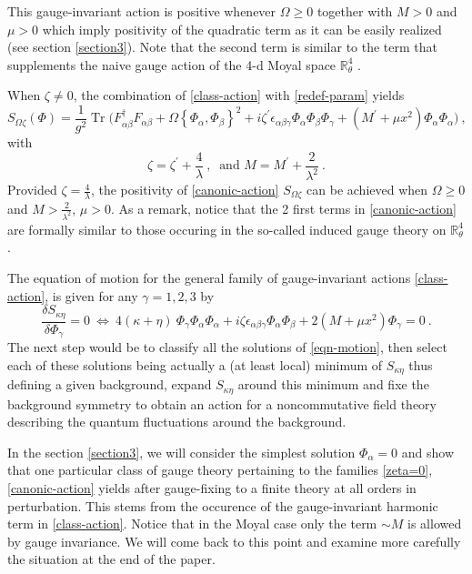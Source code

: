 \documentclass[a4paper,11pt,twoside]{article}
\numberwithin{equation}{section}
\DeclareMathOperator{\tr}{Tr}
\theoremstyle{nonumberplain}
\newcounter{and}
\begin{document}
%
This gauge-invariant action is positive whenever $\Omega\ge0$ together with $M>0$ and $\mu>0$ which imply positivity of the quadratic term as it can be easily realized (see section \ref{section3}). Note that the second term is similar to the term that supplements the naive gauge action of the 4-d Moyal space $\mathbb{R}^4_\theta$ \cite{GWW, GW07}.\par%
%
When $\zeta\ne0$, the combination of \eqref{class-action} with \eqref{redef-param} yields%
%
\begin{equation}
S_{\Omega\zeta}(\Phi) = \frac{1}{g^2} \tr\bigg(F^\dag_{\alpha\beta}F_{\alpha\beta} + \Omega\left\{\Phi_\alpha,\Phi_\beta\right\}^2 + i \zeta^\prime\epsilon_{\alpha\beta\gamma} \Phi_\alpha \Phi_\beta \Phi_\gamma + \left(M^\prime+\mu x^2\right) \Phi_\alpha \Phi_\alpha \bigg) \ , \label{canonic-action}
\end{equation}
%
with%
%
\begin{equation}
\zeta = \zeta^\prime+\frac{4}{\lambda} \ , \ \mbox{ and }  M=M^\prime+\frac{2}{\lambda^2} \ . \label{new-param}
\end{equation}
%
Provided $\zeta=\frac{4}{\lambda}$, the positivity of \eqref{canonic-action} $S_{\Omega\zeta}$ can be achieved when $\Omega\ge0$ and $M>\frac{2}{\lambda^2}$, $\mu>0$. As a remark, notice that the 2 first terms in \eqref{canonic-action} are formally similar to those occuring in the so-called induced gauge theory on $\mathbb{R}^4_\theta$ \cite{GWW, GW07}.\par%
%
The equation of motion for the general family of gauge-invariant actions \eqref{class-action}, is given for any $\gamma=1,2,3$ by%
%
\begin{equation}
\frac{\delta S_{\kappa\eta}}{\delta{\Phi}_\gamma}=0 \ \Longleftrightarrow \ 4 \left(\kappa+\eta\right) \ \Phi_\gamma \Phi_\alpha \Phi_\alpha + i \zeta \epsilon_{\alpha\beta\gamma} \Phi_\alpha \Phi_\beta + 2(M+\mu x^2) \Phi_\gamma = 0 \ . \label{eqn-motion}
\end{equation}
%
The next step would be to classify all the solutions of \eqref{eqn-motion}, then select each of these solutions being actually a (at least local) minimum of $S_{\kappa\eta}$ thus defining a given background, expand $S_{\kappa\eta}$ around this minimum and fixe the background symmetry to obtain an action for a noncommutative field theory describing the quantum fluctuations around the background.\par%
%
In the section \ref{section3}, we will consider the simplest solution $\Phi_\alpha=0$ and show that one particular class of gauge theory pertaining to the families \eqref{zeta=0}, \eqref{canonic-action} yields after gauge-fixing to a finite theory at all orders in perturbation. This stems from the occurence of the gauge-invariant harmonic term in \eqref{class-action}. Notice that in the Moyal case only the term $\sim M$ is allowed by gauge invariance. We will come back to this point and examine more carefully the situation at the end of the paper.\par%
\end{document}
